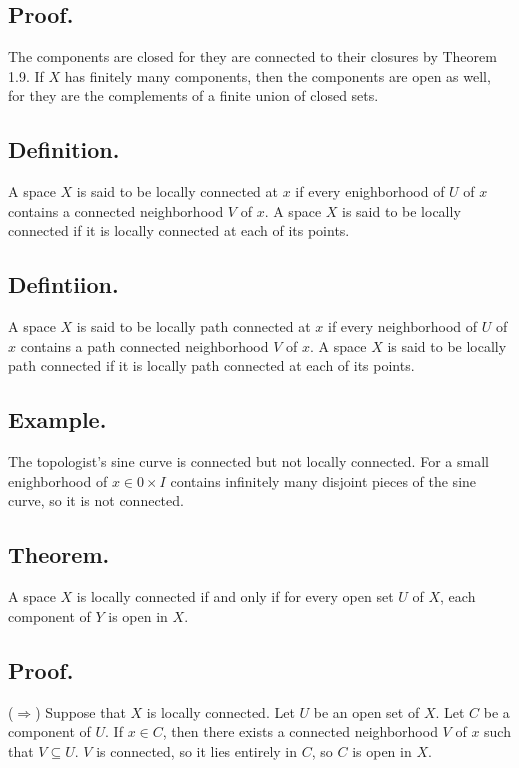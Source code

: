 \documentclass[titlepage]{article}
\begin{document}
\subsection{Proof.} The components are closed for they are connected to their closures by Theorem 1.9. If $X$ has finitely many components, then the components are open as well, for they are the complements of a finite union of closed sets.

\subsection{Definition.} A space $X$ is said to be locally connected at $x$ if every enighborhood of $U$ of $x$ contains a connected neighborhood $V$ of $x$. A space $X$ is said to be locally connected if it is locally connected at each of its points.

\subsection{Defintiion.} A space $X$ is said to be locally path connected at $x$ if every neighborhood of $U$ of $x$ contains a path connected neighborhood $V$ of $x$. A space $X$ is said to be locally path connected if it is locally path connected at each of its points.

\subsection{Example.} The topologist's sine curve is connected but not locally connected. For a small enighborhood of $x \in 0 \times I$ contains infinitely many disjoint pieces of the sine curve, so it is not connected.

\subsection{Theorem.} A space $X$ is locally connected if and only if for every open set $U$ of $X$, each component of $Y$ is open in $X$.

\subsection{Proof.}

($\Rightarrow$) Suppose that $X$ is locally connected. Let $U$ be an open set of $X$. Let $C$ be a component of $U$. If $x \in C$, then there exists a connected neighborhood $V$ of $x$ such that $V \subseteq U$. $V$ is connected, so it lies entirely in $C$, so $C$ is open in $X$.
\end{document}
